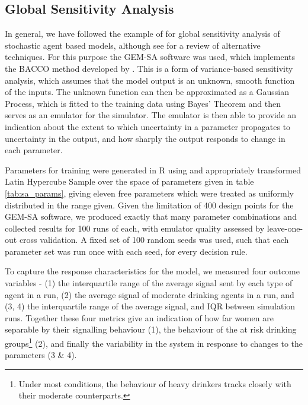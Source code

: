 \subsection{Global Sensitivity Analysis}
\label{sub:sensitivity}

In general, we have followed the example of \cite{Bijak2013b} for global sensitivity analysis of stochastic agent based models, although see \citet{Thiele2014} for a review of alternative techniques. For this purpose the \ac{GEM-SA} software \citep{Kennedy} was used, which implements the \ac{BACCO} method developed by \citeauthor{Oakley2004} \citep{Oakley2002,Oakley2004,Dorresteijn2010}. This is a form of variance-based sensitivity analysis, which assumes that the model output is an unknown, smooth function of the inputs. The unknown function can then be approximated as a Gaussian Process, which is fitted to the training data using Bayes' Theorem and then serves as an emulator for the simulator. The emulator is then able to provide an indication about the extent to which uncertainty in a parameter propagates to uncertainty in the output, and how sharply the output responds to change in each parameter.

\begin{comment}

Justification for doing SA, point out the wide variety of places this gets used. Talk about uncertainty, briefly raise model discrepancy.

\end{comment}

Parameters for training were generated in R \citep{RTeam2014} using and appropriately transformed Latin Hypercube Sample \citep{Carnell2012} over the space of parameters given in table \ref{tab:sa_params}, giving eleven free parameters which were treated as uniformly distributed in the range given.  Given the limitation of 400 design points for the \ac{GEM-SA} software, we produced exactly that many parameter combinations and collected results for 100 runs of each, with emulator quality assessed by leave-one-out cross validation. A fixed set of 100 random seeds was used, such that each parameter set was run once with each seed, for every decision rule.

To capture the response characteristics for the model, we measured four outcome variables - (1) the interquartile range of the average signal sent by each type of agent in a run, (2) the average signal of moderate drinking agents in a run, and (3, 4) the interquartile range of the average signal, and \ac{IQR} between simulation runs. Together these four metrics give an indication of how far women are separable by their signalling behaviour (1), the behaviour of the at risk drinking groups\footnote{Under most conditions, the behaviour of heavy drinkers tracks closely with their moderate counterparts.} (2), and finally the variability in the system in response to changes to the parameters (3 \& 4).

